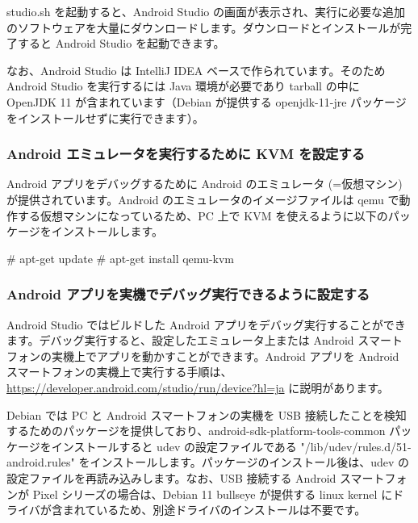 \documentclass[mingoth,a4paper]{jsarticle}
\begin{document}

studio.sh を起動すると、Android Studio の画面が表示され、実行に必要な追加のソフトウェアを大量にダウンロードします。ダウンロードとインストールが完了すると Android Studio を起動できます。

なお、Android Studio は IntelliJ IDEA ベースで作られています。そのため Android Studio を実行するには Java 環境が必要であり tarball の中に OpenJDK 11 が含まれています（Debian が提供する openjdk-11-jre パッケージをインストールせずに実行できます）。


\subsubsection{Android エミュレータを実行するために KVM を設定する}

Android アプリをデバッグするために Android のエミュレータ (=仮想マシン) が提供されています。Android のエミュレータのイメージファイルは qemu で動作する仮想マシンになっているため、PC 上で KVM を使えるように以下のパッケージをインストールします。

\begin{commandline}
# apt-get update
# apt-get install qemu-kvm
\end{commandline}


\subsubsection{Android アプリを実機でデバッグ実行できるように設定する}

Android Studio ではビルドした Android アプリをデバッグ実行することができます。デバッグ実行すると、設定したエミュレータ上または Android スマートフォンの実機上でアプリを動かすことができます。Android アプリを Android スマートフォンの実機上で実行する手順は、\url{https://developer.android.com/studio/run/device?hl=ja} に説明があります。

Debian では PC と Android スマートフォンの実機を USB 接続したことを検知するためのパッケージを提供しており、android-sdk-platform-tools-common パッケージをインストールすると udev の設定ファイルである "/lib/udev/rules.d/51-android.rules" をインストールします。パッケージのインストール後は、udev の設定ファイルを再読み込みします。なお、USB 接続する Android スマートフォンが Pixel シリーズの場合は、Debian 11 bullseye が提供する linux kernel にドライバが含まれているため、別途ドライバのインストールは不要です。
\end{document}
